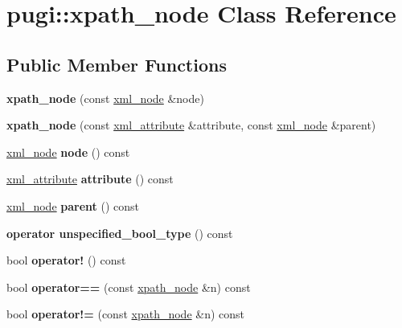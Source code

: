 \hypertarget{classpugi_1_1xpath__node}{}\section{pugi\+:\+:xpath\+\_\+node Class Reference}
\label{classpugi_1_1xpath__node}
\subsection*{Public Member Functions}
\begin{DoxyCompactItemize}
\item 
\mbox{\label{classpugi_1_1xpath__node_af35940ce58d68e3210c88c816396c158}} 
{\bfseries xpath\+\_\+node} (const \hyperlink{classpugi_1_1xml__node}{xml\+\_\+node} \&node)
\item 
\mbox{\label{classpugi_1_1xpath__node_a64e77111af6283205e83b97b76d953d0}} 
{\bfseries xpath\+\_\+node} (const \hyperlink{classpugi_1_1xml__attribute}{xml\+\_\+attribute} \&attribute, const \hyperlink{classpugi_1_1xml__node}{xml\+\_\+node} \&parent)
\item 
\mbox{\label{classpugi_1_1xpath__node_ab2d0ba839e8775a6749afd1490625238}} 
\hyperlink{classpugi_1_1xml__node}{xml\+\_\+node} {\bfseries node} () const
\item 
\mbox{\label{classpugi_1_1xpath__node_aa041fffb74a1e39f30d8189928077a4c}} 
\hyperlink{classpugi_1_1xml__attribute}{xml\+\_\+attribute} {\bfseries attribute} () const
\item 
\mbox{\label{classpugi_1_1xpath__node_a9bcdc7cbfa9dc175fc2d41f0161ef531}} 
\hyperlink{classpugi_1_1xml__node}{xml\+\_\+node} {\bfseries parent} () const
\item 
\mbox{\label{classpugi_1_1xpath__node_a6b64be6e98c5311cf02ba42c7c0e898a}} 
{\bfseries operator unspecified\+\_\+bool\+\_\+type} () const
\item 
\mbox{\label{classpugi_1_1xpath__node_a7421e6d8120a5a5a889215bb40b575db}} 
bool {\bfseries operator!} () const
\item 
\mbox{\label{classpugi_1_1xpath__node_aff5c88cfcb8ad8d6b78d4a17afcc0780}} 
bool {\bfseries operator==} (const \hyperlink{classpugi_1_1xpath__node}{xpath\+\_\+node} \&n) const
\item 
\mbox{\label{classpugi_1_1xpath__node_ac2f226bb9bb857bac2b23690d4d6d766}} 
bool {\bfseries operator!=} (const \hyperlink{classpugi_1_1xpath__node}{xpath\+\_\+node} \&n) const
\end{DoxyCompactItemize}

